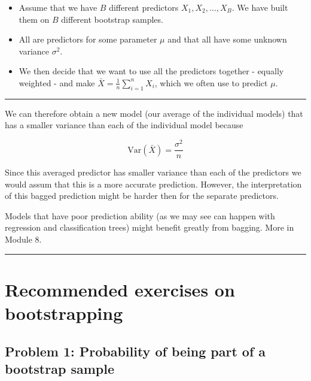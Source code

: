 \documentclass[]{article}
\providecommand{\tightlist}{%
  \setlength{\itemsep}{0pt}\setlength{\parskip}{0pt}}
\begin{document}
\begin{itemize}
\tightlist
\item
  Assume that we have \(B\) different predictors
  \(X_1, X_2, \ldots, X_B\). We have built them on \(B\) different
  bootstrap samples.
\item
  All are predictors for some parameter \(\mu\) and that all have some
  unknown variance \(\sigma^2\).
\item
  We then decide that we want to use all the predictors together -
  equally weighted - and make \(\bar{X}=\frac{1}{n} \sum_{i=1}^n X_i\),
  which we often use to predict \(\mu\).
\end{itemize}

\begin{center}\rule{0.5\linewidth}{\linethickness}\end{center}

We can therefore obtain a new model (our average of the individual
models) that has a smaller variance than each of the individual model
because

\[\text{Var}(\bar{X})=\frac{\sigma^2}{n}\]

Since this averaged predictor has smaller variance than each of the
predictors we would assum that this is a more accurate prediction.
However, the interpretation of this bagged prediction might be harder
then for the separate predictors.

Models that have poor prediction ability (as we may see can happen with
regression and classification trees) might benefit greatly from bagging.
More in Module 8.

\begin{center}\rule{0.5\linewidth}{\linethickness}\end{center}

\hypertarget{recommended-exercises-on-bootstrapping}{%
\section{Recommended exercises on
bootstrapping}\label{recommended-exercises-on-bootstrapping}}

\hypertarget{problem-1-probability-of-being-part-of-a-bootstrap-sample}{%
\subsection{Problem 1: Probability of being part of a bootstrap
sample}\label{problem-1-probability-of-being-part-of-a-bootstrap-sample}}
\end{document}
